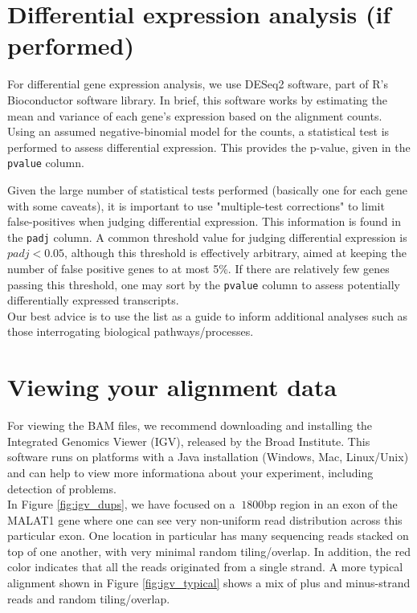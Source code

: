 \documentclass{article}
\begin{document}
{\section{Differential expression analysis (if performed)}

For differential gene expression analysis, we use DESeq2 \cite{deseq2} software, part of R's Bioconductor software library.  In brief, this software works by estimating the mean and variance of each gene's expression based on the 
alignment counts.  Using an assumed negative-binomial model for the counts, a statistical test is performed to assess differential expression.  This provides the p-value, given in the \verb|pvalue| column.  

Given the large number of statistical tests performed (basically one for each gene with some caveats), it is important to use "multiple-test corrections" to limit false-positives when judging differential expression.
This information is found in the \verb|padj| column.  A common threshold value for judging differential expression is $padj < 0.05$, although this threshold is effectively arbitrary, aimed at keeping the number of false positive genes to at most 5\%.  If there are relatively few genes passing this threshold, one may sort by the \verb|pvalue| column to assess potentially differentially expressed transcripts.\\

Our best advice is to use the list as a guide to inform additional analyses such as those interrogating biological pathways/processes.  

\section{Viewing your alignment data}
\label{sec:igv}
For viewing the BAM files, we recommend downloading and installing the Integrated Genomics Viewer (IGV), released by the Broad Institute.  This software runs on platforms with a Java installation (Windows, Mac, Linux/Unix) and can help to view more informationa about your experiment, including detection of problems. \\

In Figure \ref{fig:igv_dups}, we have focused on a $~1800$bp region in an exon of the MALAT1 gene where one can see very non-uniform read distribution across this particular exon.  One location in particular has many sequencing reads stacked on top of one another, with very minimal random tiling/overlap.  In addition, the red color indicates that all the reads originated from a single strand.  A more typical alignment shown in Figure \ref{fig:igv_typical} shows a mix of plus and minus-strand reads and random tiling/overlap.

}
\end{document}

